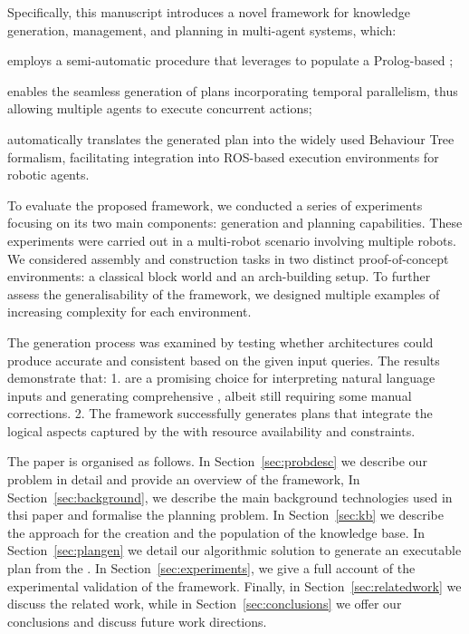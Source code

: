 Specifically, this manuscript introduces a novel framework for knowledge generation, management, and planning in multi-agent systems, which:  
\begin{enumerate*}[label=\roman*)]  
    \item employs a semi-automatic procedure that leverages \llms to populate a Prolog-based \kb;  
    \item enables the seamless generation of plans incorporating temporal parallelism, thus allowing multiple agents to execute concurrent actions;  
    \item automatically translates the generated plan into the widely used Behaviour Tree formalism, facilitating integration into ROS-based execution environments for robotic agents.  
\end{enumerate*}  



To evaluate the proposed framework, we conducted a series of
experiments focusing on its two main components: \kb generation and
planning capabilities. These experiments were carried out in a
multi-robot scenario involving multiple robots. We considered assembly
and construction tasks in two distinct proof-of-concept environments:
a classical block world and an arch-building setup. To further assess
the generalisability of the framework, we designed multiple examples
of increasing complexity for each environment.

The \kb generation process was examined by testing whether \llm
architectures could produce accurate and consistent \kbs based on the
given input queries.  The results demonstrate that: 1. \llms are a
promising choice for interpreting natural language inputs and
generating comprehensive \kbs, albeit still requiring some manual
corrections.  2. The framework successfully generates plans that
integrate the logical aspects captured by the \kb\/ with resource
availability and constraints.

The paper is organised as follows. In Section~\ref{sec:probdesc} we
describe our problem in detail and provide an overview of the
framework, In Section~\ref{sec:background}, we describe the main
background technologies used in thsi paper and formalise the planning
problem.  In Section~\ref{sec:kb} we describe the approach for the
creation and the population of the knowledge base.  In
Section~\ref{sec:plangen} we detail our algorithmic solution to
generate an executable plan from the \kb. In
Section~\ref{sec:experiments}, we give a full account of the
experimental validation of the framework.  Finally, in
Section~\ref{sec:relatedwork} we discuss the related work, while in
Section~\ref{sec:conclusions} we offer our conclusions and discuss
future work directions.









